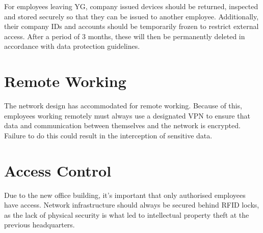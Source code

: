 For employees leaving YG, company issued devices should be returned, inspected and stored securely so that they can be issued to another employee. Additionally, their company IDs and accounts should be temporarily frozen to restrict external access. After a period of 3 months, these will then be permanently deleted in accordance with data protection guidelines.

\section{Remote Working}
The network design has accommodated for remote working. Because of this, employees working remotely must always use a designated VPN to ensure that data and communication between themselves and the network is encrypted. Failure to do this could result in the interception of sensitive data.

\section{Access Control}
Due to the new office building, it's important that only authorised employees have access. Network infrastructure should always be secured behind RFID locks, as the lack of physical security is what led to intellectual property theft at the previous headquarters.
